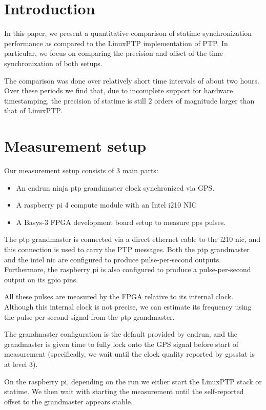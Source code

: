 \documentclass{article}
\begin{document}
\section{Introduction}

In this paper, we present a quantitative comparison of statime synchronization performance as compared to the LinuxPTP implementation of PTP. In particular, we focus on comparing the precision and offset of the time synchronization of both setups.

The comparison was done over relatively short time intervals of about two hours. Over these periods we find that, due to incomplete support for hardware timestamping, the precision of statime is still $2$ orders of magnitude larger than that of LinuxPTP.

\section{Measurement setup}

Our measurement setup consists of 3 main parts:
\begin{itemize}
    \item An endrun ninja ptp grandmaster clock synchronized via GPS.
    \item A raspberry pi 4 compute module with an Intel i210 NIC
    \item A Basys-3 FPGA development board setup to measure pps pulses.
\end{itemize}

The ptp grandmaster is connected via a direct ethernet cable to the i210 nic, and this connection is used to carry the PTP messages. Both the ptp grandmaster and the intel nic are configured to produce pulse-per-second outputs. Furthermore, the raspberry pi is also configured to produce a pulse-per-second output on its gpio pins.

All these pulses are measured by the FPGA relative to its internal clock. Although this internal clock is not precise, we can estimate its frequency using the pulse-per-second signal from the ptp grandmaster.

The grandmaster configuration is the default provided by endrun, and the grandmaster is given time to fully lock onto the GPS signal before start of measurement (specifically, we wait until the clock quality reported by gpsstat is at level 3).

On the raspberry pi, depending on the run we either start the LinuxPTP stack or statime. We then wait with starting the measurement until the self-reported offset to the grandmaster appears stable.
\end{document}
